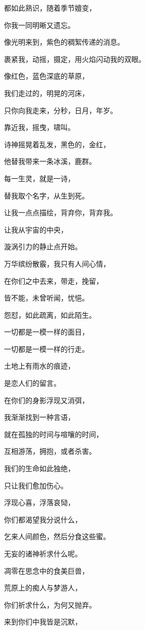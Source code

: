 \documentclass[UTF8]{article}
\begin{document}
\par 都如此熟识，随着季节嬗变，
\par 你我一同明晰又遗忘。
\par 像光明来到，紫色的稠絮传递的消息。
\par 裹紧我，动摇，摄定，用火焰闪动我的双眼。
\par 像红色，蓝色深底的草原，
\par 我们走过的，明晃的河床，
\par 只你向我走来，分秒，日月，年岁。
\par 靠近我，摇曳，啸叫。
\par 诗神摇晃着乱发，黑色的，金红，
\par 他替我带来一条冰溪，鹿群。
\par 每一生灵，就是一诗，
\par 替我取个名字，从生到死。
\par 让我一点点描绘，背弃你，背弃我。
\par 让我从宇宙的中央，
\par 漩涡引力的静止点开始。
\par 万华缤纷散霰，我只有人间心情，
\par 在你们之中去来，带走，挽留，
\par 皆不能，未曾听闻，忧悒。
\par 怨怼，如此疏离，如此陌生。
\par 一切都是一模一样的面目，
\par 一切都是一模一样的行走。
\\[0.6cm]
\par 土地上有雨水的痕迹，
\par 是恋人们的留言。
\par 在你们的身影浮现又消弭，
\par 我渐渐找到一种言语，
\par 就在孤独的时间与喧嚷的时间，
\par 互相游荡，拥抱，或者杀害。
\par 我们的生命如此独绝，
\par 只让我们愈加伤心。
\par 浮现心喜，浮落哀恸，
\par 你们都渴望我分说什么，
\par 乞来人间颜色，然后分食这些蜜。
\par 无妄的诸神祈求什么呢。
\par 凋零在思念中的食美巨兽，
\par 荒原上的痴人与梦游人，
\par 你们祈求什么，为何又抛弃。
\par 来到你们中我皆是沉默，
\end{document}
